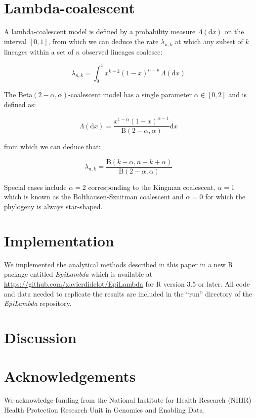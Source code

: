 \documentclass{article}
\begin{document}
\section{Lambda-coalescent}

A lambda-coalescent model is defined by a probability measure 
$\Lambda(\mathrm{d} x)$ on the interval $[0,1]$, from which we can deduce
the rate $\lambda_{n,k}$ at which any subset of $k$ lineages within a set of $n$ observed lineages 
coalesce:

\begin{equation}
    \lambda_{n,k} = \int_{0}^{1}{x^{k-2}(1-x)^{n-k}\,\Lambda(\mathrm{d} x)}
\end{equation}

The Beta$(2-\alpha,\alpha)$-coalescent model \citep{schweinsbergCoalescentProcessesObtained2003}
has a single parameter $\alpha \in [0,2]$ and is defined as:

\begin{equation}
\Lambda(\mathrm{d}x)=\frac{x^{1-\alpha}(1-x)^{\alpha-1}}{\mathrm{B}(2-\alpha,\alpha)}\mathrm{d}x
\end{equation}

from which we can deduce that:

\begin{equation}
\lambda_{n,k}=\frac{\mathrm{B}(k-\alpha,n-k+\alpha)}{\mathrm{B}(2-\alpha,\alpha)}
\end{equation}

Special cases include $\alpha=2$ corresponding to the Kingman coalescent,
$\alpha=1$ which is known as the Bolthausen-Sznitman coalescent
and $\alpha=0$ for which the phylogeny is always star-shaped.

\section{Implementation}

We implemented the analytical methods described in this paper in a 
new R package entitled \emph{EpiLambda} which is available
at \url{https://github.com/xavierdidelot/EpiLambda} for R version 3.5 or later. 
All code and data needed to replicate the results are included in the ``run'' directory of the \emph{EpiLambda} repository.

\section{Discussion}

\section*{Acknowledgements}

We acknowledge funding from the National Institute for Health Research (NIHR) Health Protection Research Unit in Genomics and Enabling Data.

\newpage

%

\end{document}
